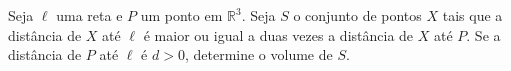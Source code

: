 Seja \(\ell\) uma reta e \(P\) um ponto em \(\mathbb{R}^3\).  
Seja \(S\) o conjunto de pontos \(X\) tais que a distância de \(X\) até \(\ell\) é maior ou igual a duas vezes a distância de \(X\) até \(P\).  
Se a distância de \(P\) até \(\ell\) é \(d>0\), determine o volume de \(S\).
